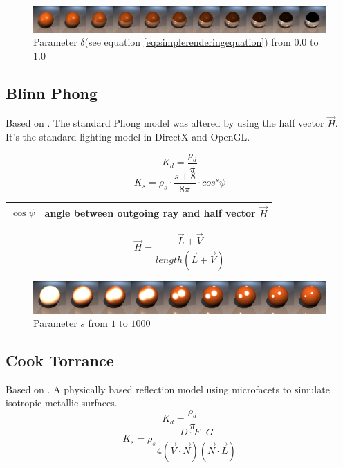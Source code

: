 \documentclass[11pt,a4paper]{article}
\begin{document}
\begin{figure}[H]

\includegraphics[width=\textwidth]{phongreflcomplete.png}
\caption{Parameter $\delta$(see equation \ref{eq:simplerenderingequation}) from $0.0$ to $1.0$}
\end{figure}


\newpage
\subsection{Blinn Phong}
Based on \cite{Bli77}. The standard Phong model was altered by using the half vector $\vec{H}$. It's the standard lighting model in DirectX and OpenGL.

\begin{equation}
K_d = \frac{\rho_d}{\pi}
\end{equation}
\begin{equation}
K_s = \rho_s \cdot \frac{s+8}{8\pi} \cdot cos^s\psi
\end{equation}

\begin{table}[H]
\begin{tabular}{| c | l |}
\hline
$\cos\psi$ & angle between outgoing ray and half vector $\vec{H}$\\ \hline
\end{tabular}
\end{table}
\begin{equation}
\vec{H} = \frac{\vec{L}+\vec{V}}{length(\vec{L}+\vec{V})}
\label{eq:H}
\end{equation}

\begin{figure}[H]

\includegraphics[width=\textwidth]{blinnphongshinecomplete.png}
\caption{Parameter $s$ from $1$ to $1000$}
\end{figure}


\newpage
\subsection{Cook Torrance}
Based on \cite{CT82}. A physically based reflection model using microfacets to simulate isotropic metallic surfaces.
\begin{equation}
K_d = \frac{\rho_d}{\pi}
\end{equation}
\begin{equation}
K_s =\rho_s \frac{D \cdot F \cdot G}{4(\vec{V} \cdot \vec{N})(\vec{N} \cdot \vec{L})}
\end{equation}
\end{document}
